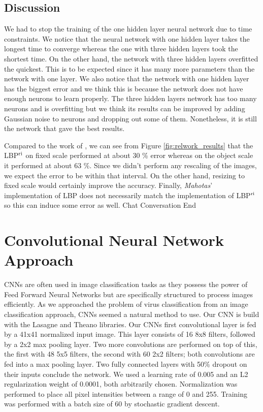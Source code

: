 \begin{multicols}{2}
\subsection{Discussion}
We had to stop the training of the one hidden layer neural network due to time constraints. We notice that the neural network with one hidden layer takes the longest time to converge whereas the one with three hidden layers took the shortest time. On the other hand, the network with three hidden layers overfitted the quickest. This is to be expected since it has many more parameters than the network with one layer. We also notice that the network with one hidden layer has the biggest error and we think this is because the network does not have enough neurons to learn properly. The three hidden layers network has too many neurons and is overfitting but we think its results can be improved by adding Gaussian noise to neurons and dropping out some of them. Nonetheless, it is still the network that gave the best results. 
\par Compared to the work of \citet{kylberg2011virus}, we can see from Figure \ref{fig:relwork_results} that the LBP$^{\textnormal{ri}}$ on fixed scale performed at about 30 \% error whereas on the object scale it performed at about 63 \%. Since we didn't perform any rescaling of the images, we expect the error to be within that interval. On the other hand, resizing to fixed scale would certainly improve the accuracy. Finally, \emph{Mahotas}' implementation of LBP does not necessarily match the implementation of LBP$^{\textnormal{ri}}$ so this can induce some error as well.
Chat Conversation End



\section{Convolutional Neural Network Approach}
CNNs are often used in image classification tasks as they possess the power of Feed Forward Neural Networks but are specifically structured to process images efficiently. As we approached the problem of virus classification from an image classification approach, CNNs seemed a natural method to use.
Our CNN is build with the Lasagne and Theano \citet{Bastien-Theano-2012, bergstra+al:2010-scipy} libraries. Our CNNs first convolutional layer is fed by a 41x41 normalized input image. This layer consists of 16 8x8 filters, followed by a 2x2 max pooling layer. Two more convolutions are performed on top of this, the first with 48 5x5 filters, the second with 60 2x2 filters; both convolutions are fed into a max pooling layer. Two fully connected layers with 50\% dropout on their inputs conclude the network. We used a learning rate of 0.005 and an L2 regularization weight of 0.0001, both arbitrarily chosen. Normalization was performed to place all pixel intensities between a range of 0 and 255. Training was performed with a batch size of 60 by stochastic gradient descent.


\end{multicols}
